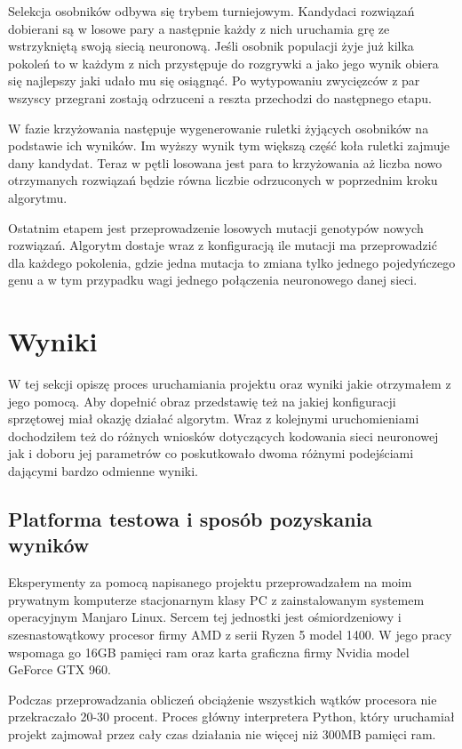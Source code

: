 \documentclass[12pt, oneside, a4paper]{report}
\begin{document}
Selekcja osobników odbywa się trybem turniejowym. Kandydaci rozwiązań dobierani są w losowe pary a następnie każdy z nich uruchamia grę ze wstrzykniętą swoją siecią neuronową. Jeśli osobnik populacji żyje już kilka pokoleń to w każdym z nich przystępuje do rozgrywki a jako jego wynik obiera się najlepszy jaki udało mu się osiągnąć. Po wytypowaniu zwycięzców z par wszyscy przegrani zostają odrzuceni a reszta przechodzi do następnego etapu.

W fazie krzyżowania następuje wygenerowanie ruletki żyjących osobników na podstawie ich wyników. Im wyższy wynik tym większą część koła ruletki zajmuje dany kandydat. Teraz w pętli losowana jest para to krzyżowania aż liczba nowo otrzymanych rozwiązań będzie równa liczbie odrzuconych w poprzednim kroku algorytmu.

Ostatnim etapem jest przeprowadzenie losowych mutacji genotypów nowych rozwiązań. Algorytm dostaje wraz z konfiguracją ile mutacji ma przeprowadzić dla każdego pokolenia, gdzie jedna mutacja to zmiana tylko jednego pojedyńczego genu a w tym przypadku wagi jednego połączenia neuronowego danej sieci.

\section{Wyniki}

W tej sekcji opiszę proces uruchamiania projektu oraz wyniki jakie otrzymałem z jego pomocą. Aby dopełnić obraz przedstawię też na jakiej konfiguracji sprzętowej miał okazję działać algorytm. Wraz z kolejnymi uruchomieniami dochodziłem też do różnych wniosków dotyczących kodowania sieci neuronowej jak i doboru jej parametrów co poskutkowało dwoma różnymi podejściami dającymi bardzo odmienne wyniki.

\subsection{Platforma testowa i sposób pozyskania wyników}

Eksperymenty za pomocą napisanego projektu przeprowadzałem na moim prywatnym komputerze stacjonarnym klasy PC z zainstalowanym systemem operacyjnym Manjaro Linux. Sercem tej jednostki jest ośmiordzeniowy i szesnastowątkowy procesor firmy AMD z serii Ryzen 5 model 1400. W jego pracy wspomaga go 16GB pamięci ram oraz karta graficzna firmy Nvidia model GeForce GTX 960.

Podczas przeprowadzania obliczeń obciążenie wszystkich wątków procesora nie przekraczało 20-30 procent. Proces główny interpretera Python, który uruchamiał projekt zajmował przez cały czas działania nie więcej niż 300MB pamięci ram.
\end{document}
